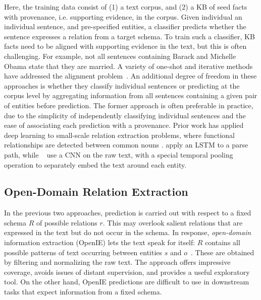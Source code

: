 Here, the training data consist of (1) a text corpus, and (2) a KB of seed facts with provenance, i.e. supporting evidence, in the corpus. Given individual an individual sentence, and pre-specified entities, a classifier predicts whether the sentence expresses a relation from a target schema. To train such a classifier, KB facts need to be aligned with supporting evidence in the text, but this is often challenging. For example, not all sentences containing Barack and Michelle Obama state that they are married. A variety of one-shot and iterative methods have addressed the alignment problem~\citep{bunescu2007learning,distant_supervision,riedel2010modeling,yao2010collective,hoffmann2011knowledge,surdeanu2012multi,min2013distant,zengdistant}.
An additional degree of freedom in these approaches is whether they classify individual sentences or predicting at the corpus level by aggregating information from all sentences containing a given pair of entities before prediction. The former approach is often preferable in practice, due to the simplicity of independently classifying individual sentences and the ease of associating each prediction with a provenance.
Prior work has applied deep learning to small-scale relation extraction problems, where functional relationships are detected between common nouns \citep{li2015tree,dos2015classifying}.
\citet{xu2015classifying} apply an LSTM to a parse path, while ~\citet{zengdistant} use a CNN on the raw text, with a special temporal pooling operation to separately embed the text around each entity.


\subsection{Open-Domain Relation Extraction
\label{sec:openIE}}
In the previous two approaches, prediction is carried out with respect to a fixed schema $R$ of possible relations $r$. This may overlook salient relations that are expressed in the text but do not occur in the schema. In response, \textit{open-domain} information extraction (OpenIE) lets the text speak for itself: $R$ contains all possible patterns of text occurring between entities $s$ and $o$~\citep{openie,etzioni2008open,resolver}. These are obtained by filtering and normalizing the raw text. The approach offers impressive coverage, avoids issues of distant supervision, and provides a useful exploratory tool. On the other hand, OpenIE predictions are difficult to use in downstream tasks that expect information from a fixed schema. 

